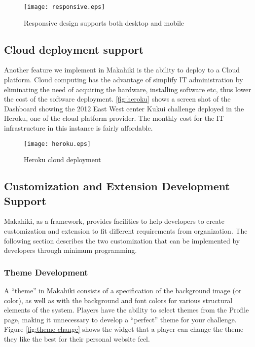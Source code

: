 \begin{figure}[!ht]
  \center
  \texttt{[image: responsive.eps]}
  \caption{Responsive design supports both desktop and mobile}
  \label{fig:responsive}
\end{figure}

\clearpage

\subsection{Cloud deployment support}
Another feature we implement in Makahiki is the ability to deploy to a Cloud platform. Cloud computing has the advantage of simplify IT administration by eliminating the need of acquiring the hardware, installing software etc, thus lower the cost of the software deployment. \autoref{fig:heroku} shows a screen shot of the Dashboard showing the 2012 East West center Kukui challenge deployed in the Heroku, one of the cloud platform provider. The monthly cost for the IT infrastructure in this instance is fairly affordable. 

\begin{figure}[!ht]
  \center
  \texttt{[image: heroku.eps]}
  \caption{Heroku cloud deployment}
  \label{fig:heroku}
\end{figure}

\clearpage

\subsection{Customization and Extension Development Support}
Makahiki, as a framework, provides facilities to help developers to create customization and extension to fit different requirements from  organization. The following section describes the two customization that can be implemented by developers through minimum programming.

\subsubsection{Theme Development}
A ``theme'' in Makahiki consists of a specification of the background image (or color), as well as with the background and font colors for various structural elements of the system. Players have the ability to select themes from the Profile page, making it unnecessary to develop a ``perfect'' theme for your challenge. Figure \ref{fig:theme-change} shows the widget that a player can change the theme they like the best for their personal website feel. 

